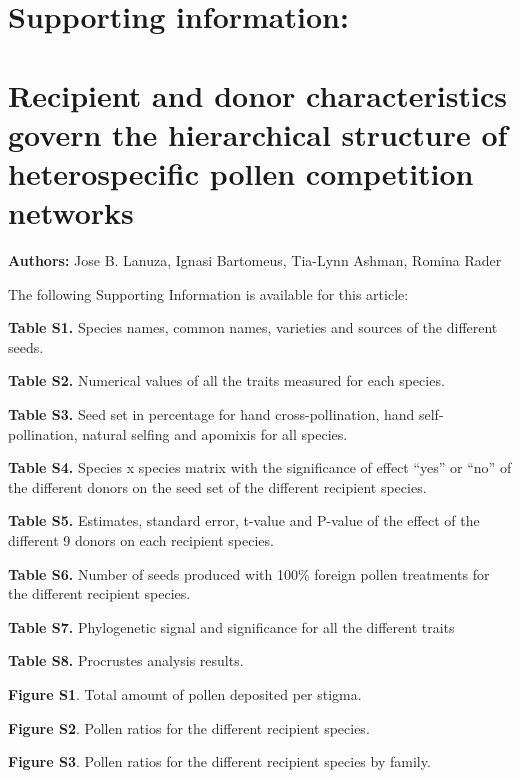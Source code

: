 \documentclass[12pt,]{article}
\author{}
\date{\vspace{-2.5em}}
\begin{document}
\captionsetup[figure]{labelformat=empty}
\captionsetup[table]{labelformat=empty} \renewcommand{\figurename}{}

\section{Supporting information:}\label{supporting-information}

\section{Recipient and donor characteristics govern the hierarchical
structure of heterospecific pollen competition
networks}\label{recipient-and-donor-characteristics-govern-the-hierarchical-structure-of-heterospecific-pollen-competition-networks}

\textbf{Authors:} Jose B. Lanuza, Ignasi Bartomeus, Tia-Lynn Ashman,
Romina Rader

The following Supporting Information is available for this article:

\textbf{Table S1.} Species names, common names, varieties and sources of
the different seeds.

\textbf{Table S2.} Numerical values of all the traits measured for each
species.

\textbf{Table S3.} Seed set in percentage for hand cross-pollination,
hand self-pollination, natural selfing and apomixis for all species.

\textbf{Table S4.} Species x species matrix with the significance of
effect ``yes'' or ``no'' of the different donors on the seed set of the
different recipient species.

\textbf{Table S5.} Estimates, standard error, t-value and P-value of the
effect of the different 9 donors on each recipient species.

\textbf{Table S6.} Number of seeds produced with 100\% foreign pollen
treatments for the different recipient species.

\textbf{Table S7.} Phylogenetic signal and significance for all the
different traits

\textbf{Table S8.} Procrustes analysis results.

\textbf{Figure S1}. Total amount of pollen deposited per stigma.

\textbf{Figure S2}. Pollen ratios for the different recipient species.

\textbf{Figure S3}. Pollen ratios for the different recipient species by
family.
\end{document}
